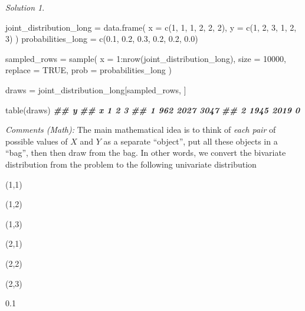 \documentclass[
]{book}
\newenvironment{Shaded}{\begin{snugshade}}{\end{snugshade}}
\newcommand{\AttributeTok}[1]{\textcolor[rgb]{0.77,0.63,0.00}{#1}}
\newcommand{\ConstantTok}[1]{\textcolor[rgb]{0.00,0.00,0.00}{#1}}
\newcommand{\DecValTok}[1]{\textcolor[rgb]{0.00,0.00,0.81}{#1}}
\newcommand{\DocumentationTok}[1]{\textcolor[rgb]{0.56,0.35,0.01}{\textbf{\textit{#1}}}}
\newcommand{\FloatTok}[1]{\textcolor[rgb]{0.00,0.00,0.81}{#1}}
\newcommand{\FunctionTok}[1]{\textcolor[rgb]{0.00,0.00,0.00}{#1}}
\newcommand{\NormalTok}[1]{#1}
\newcommand{\OtherTok}[1]{\textcolor[rgb]{0.56,0.35,0.01}{#1}}
\newcommand{\SpecialCharTok}[1]{\textcolor[rgb]{0.00,0.00,0.00}{#1}}
\theoremstyle{definition}
\theoremstyle{definition}
\theoremstyle{definition}
\theoremstyle{definition}
\theoremstyle{remark}
\newtheorem*{solution}{Solution}
\begin{document}
\begin{solution}
~

\begin{Shaded}
\begin{Highlighting}[]
\NormalTok{joint\_distribution\_long }\OtherTok{=} \FunctionTok{data.frame}\NormalTok{(}
   \AttributeTok{x =} \FunctionTok{c}\NormalTok{(}\DecValTok{1}\NormalTok{, }\DecValTok{1}\NormalTok{, }\DecValTok{1}\NormalTok{, }\DecValTok{2}\NormalTok{, }\DecValTok{2}\NormalTok{, }\DecValTok{2}\NormalTok{),}
   \AttributeTok{y =} \FunctionTok{c}\NormalTok{(}\DecValTok{1}\NormalTok{, }\DecValTok{2}\NormalTok{, }\DecValTok{3}\NormalTok{, }\DecValTok{1}\NormalTok{, }\DecValTok{2}\NormalTok{, }\DecValTok{3}\NormalTok{)}
\NormalTok{)}
\NormalTok{probabilities\_long }\OtherTok{=} 
       \FunctionTok{c}\NormalTok{(}\FloatTok{0.1}\NormalTok{, }\FloatTok{0.2}\NormalTok{, }\FloatTok{0.3}\NormalTok{, }\FloatTok{0.2}\NormalTok{, }\FloatTok{0.2}\NormalTok{, }\FloatTok{0.0}\NormalTok{)}

\NormalTok{sampled\_rows }\OtherTok{=} \FunctionTok{sample}\NormalTok{(}
   \AttributeTok{x =} \DecValTok{1}\SpecialCharTok{:}\FunctionTok{nrow}\NormalTok{(joint\_distribution\_long),}
   \AttributeTok{size =} \DecValTok{10000}\NormalTok{,}
   \AttributeTok{replace =} \ConstantTok{TRUE}\NormalTok{,}
   \AttributeTok{prob =}\NormalTok{ probabilities\_long}
\NormalTok{)}

\NormalTok{draws }\OtherTok{=}\NormalTok{ joint\_distribution\_long[sampled\_rows, ]}

\FunctionTok{table}\NormalTok{(draws)}
\DocumentationTok{\#\#    y}
\DocumentationTok{\#\# x      1    2    3}
\DocumentationTok{\#\#   1  962 2027 3047}
\DocumentationTok{\#\#   2 1945 2019    0}
\end{Highlighting}
\end{Shaded}

\emph{Comments (Math):} The main mathematical idea is to think of \emph{each pair} of possible values
of \(X\) and \(Y\) as a separate ``object'', put all these objects in a ``bag'', then
then draw from the bag. In other words, we convert the bivariate distribution
from the problem to the following univariate distribution

(1,1)

(1,2)

(1,3)

(2,1)

(2,2)

(2,3)

0.1


\end{solution}
\end{document}
